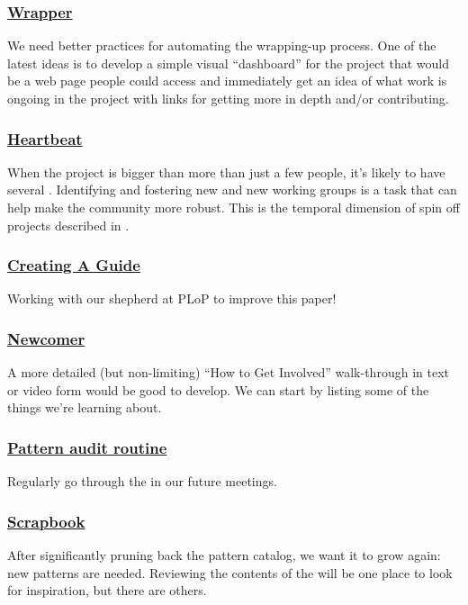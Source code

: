 \subsubsection*{\hyperref[sec:Wrapper]{Wrapper}}  We need better practices for automating the wrapping-up process. One of the latest ideas is to develop a simple visual ``dashboard'' for the project that would be a web page people could access and immediately get an idea of what work is ongoing in the project with links for getting more in depth and/or contributing.

\subsubsection*{\hyperref[sec:Heartbeat]{Heartbeat}} When the project is bigger than more than just a few people, it's likely to have several .  Identifying and fostering new  and new working groups is a task that can help make the community more robust.  This is the temporal dimension of spin off projects described in .

\subsubsection*{\hyperref[sec:Creating_a_guide]{Creating A Guide}}
Working with our shepherd at PLoP to improve this paper!

\subsubsection*{\hyperref[sec:Newcomer]{Newcomer}} A more detailed (but non-limiting) ``How to Get Involved'' walk-through in text or video form would be good to develop. We can start by listing some of the things we're learning about.

\subsubsection*{\hyperref[sec:Pattern_Audit_Routine]{Pattern audit routine}} Regularly go through the  in our future meetings.

\subsubsection*{\hyperref[sec:Scrapbook]{Scrapbook}} After significantly pruning back the pattern catalog, we want it to grow again: new patterns are needed.  Reviewing the contents of the  will be one place to look for inspiration, but there are others.





